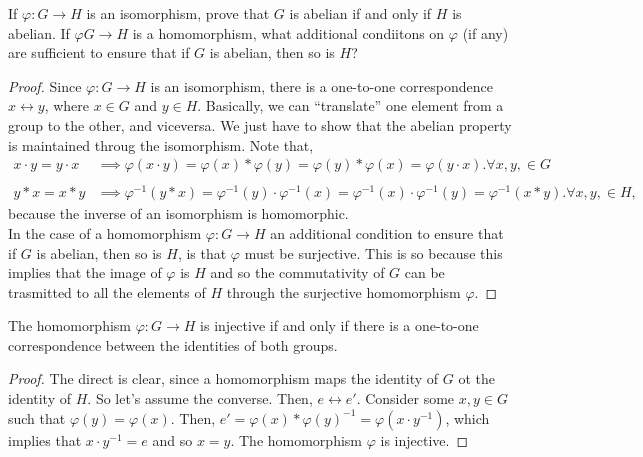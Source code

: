 \documentclass[12pt]{article}
\newenvironment{problem}[2][Problem]{\begin{trivlist} \item[\hskip \labelsep {\bfseries #1}\hskip \labelsep {\bfseries #2.}]}{\end{trivlist}}
\begin{document}
\begin{problem}{3}
  If $\varphi:G\to H$ is an isomorphism, prove that $G$ is abelian if and only if $H$ is abelian. If $\varphi G\to H$ is a homomorphism, what additional condiitons on $\varphi$ (if any) are sufficient to ensure that if $G$ is abelian, then so is $H$?
\begin{proof}
  Since $\varphi:G\to H$ is an isomorphism, there is a one-to-one correspondence $x\leftrightarrow y$, where $x\in G$ and $y\in H$. Basically, we can ``translate'' one element from a group to the other, and viceversa. We just have to show that the abelian property is maintained throug the isomorphism. Note that,
\begin{align*}
  x\cdot y = y\cdot x &\implies \varphi(x\cdot y) = \varphi(x) * \varphi(y) = \varphi(y) * \varphi(x) = \varphi (y\cdot x). \forall x,y,\in G\\
  \\
  y*x =x*y &\implies \varphi^{-1}(y*x) = \varphi^{-1}(y)\cdot \varphi^{-1}(x) = \varphi^{-1}(x)\cdot \varphi^{-1}(y) = \varphi^{-1}(x*y). \forall x,y,\in H,
\end{align*}
because the inverse of an isomorphism is homomorphic.\\
In the case of a homomorphism $\varphi: G\to H$ an additional condition to ensure that if $G$ is abelian, then so is $H$, is that $\varphi$ must be surjective. This is so because this implies that the image of $\varphi$ is $H$ and so the commutativity of $G$ can be trasmitted to all the elements of $H$ through the surjective homomorphism $\varphi$. 
\end{proof}
\end{problem}

\begin{problem}{I}
  The homomorphism $\varphi:G\to H$ is injective if and only if there is a one-to-one correspondence between the identities of both groups.
\begin{proof}
  The direct is clear, since a homomorphism maps the identity of $G$ ot the identity of $H$. So let's assume the converse. Then, $e\leftrightarrow e'$. Consider some $x,y \in G$ such that $\varphi(y) = \varphi(x)$. Then, $e' = \varphi(x)* \varphi(y)^{-1} = \varphi(x\cdot y^{-1})$, which implies that $x\cdot y^{-1}=e$ and so $x=y$. The homomorphism $\varphi$ is injective.
\end{proof}
\end{problem}
       
\end{document}
